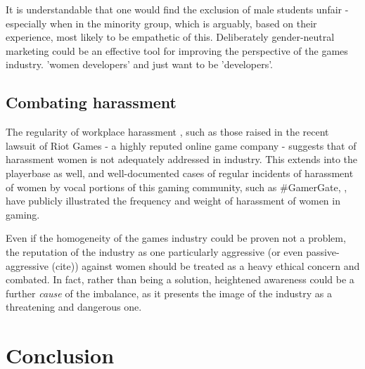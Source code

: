 \documentclass{scrartcl}
\begin{document}
It is understandable that one would find the exclusion of male students unfair - especially when in the minority group, which is arguably, based on their experience, most likely to be empathetic of this. Deliberately gender-neutral marketing could be an effective tool for improving the perspective of the games industry.  'women developers' and just want to be 'developers'.

\subsection{Combating harassment}
The regularity of workplace harassment \cite{allan_fair_2017, gonzalez_entering_2014}, such as those raised in the recent lawsuit of Riot Games \cite{saba_negron_nodate} - a highly reputed online game company - suggests that of harassment women is not adequately addressed in industry. This extends into the playerbase as well, and well-documented cases of regular incidents of harassment of women by vocal portions of this gaming community, such as \#GamerGate, \cite{Chatzakou:2017:HBS:3078714.3078721, gonzalez_entering_2014, allan_fair_2017}, have publicly illustrated the frequency and weight of harassment of women in gaming.

Even if the homogeneity of the games industry could be proven not a problem, the reputation of the industry as one particularly aggressive (or even passive-aggressive (cite)) against women should be treated as a heavy ethical concern and combated. In fact, rather than being a solution, heightened awareness could be a further \textit{cause} of the imbalance, as it presents the image of the industry as a threatening and dangerous one.

\section{Conclusion}


 

\end{document}
